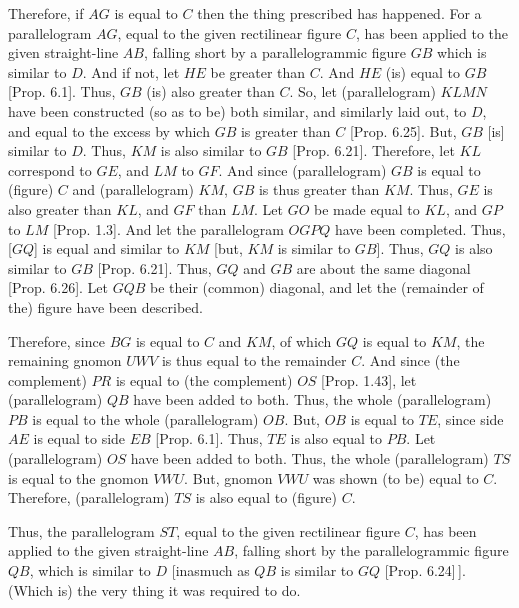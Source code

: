 \begin{Parallel}{}{}
{Therefore, if $AG$ is equal to $C$ then the thing prescribed has happened. For
a parallelogram  $AG$, equal to the given rectilinear figure $C$, has been
applied to the given straight-line $AB$, falling short by a parallelogrammic
figure $GB$ which is similar to $D$. And if not,  let $HE$ be greater than $C$. 
And $HE$ (is) equal to $GB$ [Prop. 6.1]. 
Thus, $GB$ (is) also greater than $C$.
So, let (parallelogram) $KLMN$ have been constructed (so as to be) both similar, and similarly laid out, to $D$,
and equal to the excess by which $GB$ is greater than $C$ [Prop. 6.25]. But, $GB$ [is] similar to
$D$. Thus, $KM$ is also similar to $GB$
[Prop. 6.21]. Therefore, let $KL$ correspond to
$GE$, and $LM$ to $GF$. And since (parallelogram) $GB$ is equal to
(figure) $C$ and (parallelogram) $KM$, $GB$ is thus greater than $KM$. Thus,
$GE$ is also greater than $KL$, and $GF$ than $LM$. Let $GO$ be made equal to
$KL$, and $GP$ to $LM$  [Prop. 1.3]. And let the parallelogram
$OGPQ$ have been completed. Thus, [$GQ$] is equal and similar to
$KM$ [but, $KM$ is similar to $GB$]. Thus, $GQ$ is also similar to $GB$ [Prop. 6.21]. Thus, $GQ$ and $GB$ are about the
same diagonal [Prop. 6.26]. 
Let $GQB$ be their (common) diagonal, and let the (remainder of the) figure have been described.

Therefore, since $BG$ is equal to $C$ and $KM$, of which $GQ$ is equal
to $KM$, the remaining gnomon $UWV$ is thus equal to the remainder $C$. 
And since (the complement) $PR$ is equal to (the complement) $OS$  [Prop. 1.43], let (parallelogram) $QB$ have been added to both. Thus, the whole
(parallelogram) $PB$ is equal to the whole (parallelogram) $OB$. But,
$OB$ is equal to $TE$, since side $AE$ is equal to side $EB$ [Prop. 6.1]. Thus, $TE$ is also equal to $PB$. 
Let (parallelogram) $OS$ have been added to both. Thus, the whole (parallelogram) $TS$ is equal to the gnomon $VWU$. But, gnomon $VWU$ was shown (to be)
equal to $C$.  Therefore, (parallelogram) $TS$ is also equal to (figure) $C$.

Thus, the parallelogram $ST$, equal to the given rectilinear figure
$C$, has been applied to the given straight-line $AB$, falling
short by the parallelogrammic figure $QB$, which is similar to $D$ [inasmuch as
$QB$ is similar to $GQ$ [Prop. 6.24]\,]. 
(Which is) the very thing it was required to do.}
\end{Parallel}


\vspace{7pt}{\footnotesize\noindent$^\dag$ This proposition is a geometric
solution of the quadratic equation $x^2 - \alpha\,x +\beta = 0$. Here,
$x$ is the ratio of a side of the deficit to the corresponding side of figure $D$, $\alpha$
is the ratio of the length of $AB$ to the length of that side of figure $D$ which corresponds to the side of the deficit running along $AB$, and $\beta$ is the
ratio of the areas of figures $C$ and $D$. The constraint corresponds to the
condition $\beta < \alpha^2/4$ for the equation to have real roots. Only the
smaller root of the equation is found. The larger root can be found by a
similar method.}

